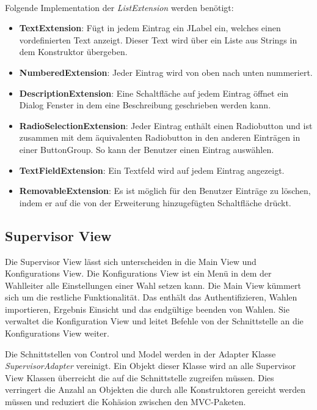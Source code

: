 \documentclass[parskip=full]{scrartcl}
\newcommand{\fakeparagraph}[1]{\textbf{#1}}
\begin{document}
		\\
		Folgende Implementation der \textit{ListExtension} werden benötigt:
		\begin{itemize}
			\item\fakeparagraph{TextExtension}: Fügt in jedem Eintrag ein JLabel ein, welches einen vordefinierten Text anzeigt. Dieser Text wird über ein Liste aus Strings in dem Konstruktor übergeben.
			\item\fakeparagraph{NumberedExtension}: Jeder Eintrag wird von oben nach unten nummeriert.
			\item\fakeparagraph{DescriptionExtension}: Eine Schaltfläche auf jedem Eintrag öffnet ein Dialog Fenster in dem eine Beschreibung geschrieben werden kann.
			\item\fakeparagraph{RadioSelectionExtension}: Jeder Eintrag enthält einen Radiobutton und ist zusammen mit dem äquivalenten Radiobutton in den anderen Einträgen in einer ButtonGroup. So kann der Benutzer einen Eintrag auswählen.
			\item\fakeparagraph{TextFieldExtension}: Ein Textfeld wird auf jedem Eintrag angezeigt.
			\item\fakeparagraph{RemovableExtension}: Es ist möglich für den Benutzer Einträge zu löschen, indem er auf die von der Erweiterung hinzugefügten Schaltfläche drückt.
		\end{itemize}
	
		\subsection{Supervisor View}
		Die Supervisor View lässt sich unterscheiden in die Main View und Konfigurations View. Die Konfigurations View ist ein Menü in dem der Wahlleiter alle Einstellungen einer Wahl setzen kann. Die Main View kümmert sich um die restliche Funktionalität. Das enthält das Authentifizieren, Wahlen importieren, Ergebnis Einsicht und das endgültige beenden von Wahlen. Sie verwaltet die Konfiguration View und leitet Befehle von der Schnittstelle an die Konfigurations View weiter.
		
		Die Schnittstellen von Control und Model werden in der Adapter Klasse \textit{SupervisorAdapter} vereinigt. Ein Objekt dieser Klasse wird an alle Supervisor View Klassen überreicht die auf die Schnittstelle zugreifen müssen. Dies verringert die Anzahl an Objekten die durch alle Konstruktoren gereicht werden müssen und reduziert die Kohäsion zwischen den MVC-Paketen.
		
\end{document}
